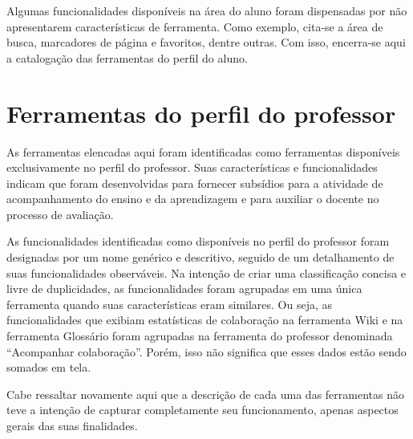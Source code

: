 Algumas funcionalidades disponíveis na área do aluno foram dispensadas por não apresentarem características de ferramenta. Como exemplo, cita-se a área de busca, marcadores de página e favoritos, dentre outras. Com isso, encerra-se aqui a catalogação das ferramentas do perfil do aluno.
\section{Ferramentas do perfil do professor}%
\label{sec:aval}
As ferramentas elencadas aqui foram identificadas como ferramentas disponíveis exclusivamente no perfil do professor. Suas características e funcionalidades indicam que foram desenvolvidas para fornecer subsídios para a atividade de acompanhamento do ensino e da aprendizagem e para auxiliar o docente no processo de avaliação.

As funcionalidades identificadas como disponíveis no perfil do professor foram designadas por um nome genérico e descritivo, seguido de um detalhamento de suas funcionalidades observáveis. Na intenção de criar uma classificação concisa e livre de duplicidades, as funcionalidades foram agrupadas em uma única ferramenta quando suas características eram similares. Ou seja, as funcionalidades que exibiam estatísticas de colaboração na ferramenta Wiki e na ferramenta Glossário foram agrupadas na ferramenta do professor denominada ``Acompanhar colaboração''. Porém, isso não significa que esses dados estão sendo somados em tela.

Cabe ressaltar novamente aqui que a descrição de cada uma das ferramentas não teve a intenção de capturar completamente seu funcionamento, apenas aspectos gerais das suas finalidades.

